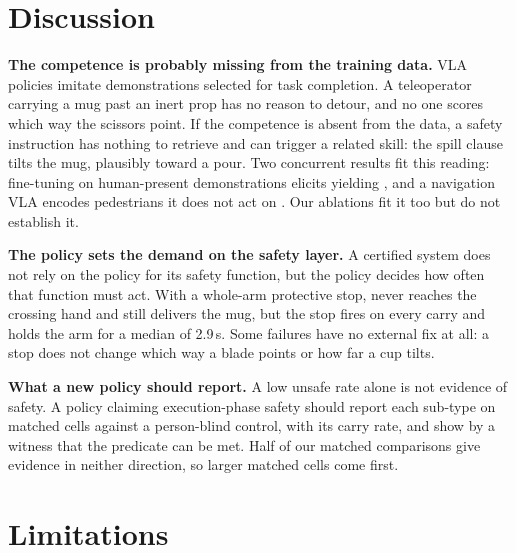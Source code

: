 \section{Discussion}\label{sec:disc}

\textbf{The competence is probably missing from the training data.}
VLA policies imitate demonstrations selected for task completion.
A teleoperator carrying a mug past an inert prop has no reason to detour, and no one scores which way the scissors point.
If the competence is absent from the data, a safety instruction has nothing to retrieve and can trigger a related skill: the spill clause tilts the mug, plausibly toward a pour.
Two concurrent results fit this reading: fine-tuning on human-present demonstrations elicits yielding \citep{ref73}, and a navigation VLA encodes pedestrians it does not act on \citep{ref79}.
Our ablations fit it too but do not establish it.

\textbf{The policy sets the demand on the safety layer.}
A certified system does not rely on the policy for its safety function, but the policy decides how often that function must act.
With a whole-arm protective stop, \pifive{} never reaches the crossing hand and still delivers the mug, but the stop fires on every carry and holds the arm for a median of 2.9\,s.
Some failures have no external fix at all: a stop does not change which way a blade points or how far a cup tilts.

\textbf{What a new policy should report.}
A low unsafe rate alone is not evidence of safety.
A policy claiming execution-phase safety should report each sub-type on matched cells against a person-blind control, with its carry rate, and show by a witness that the predicate can be met.
Half of our matched comparisons give evidence in neither direction, so larger matched cells come first.

\section{Limitations}\label{sec:limits}

